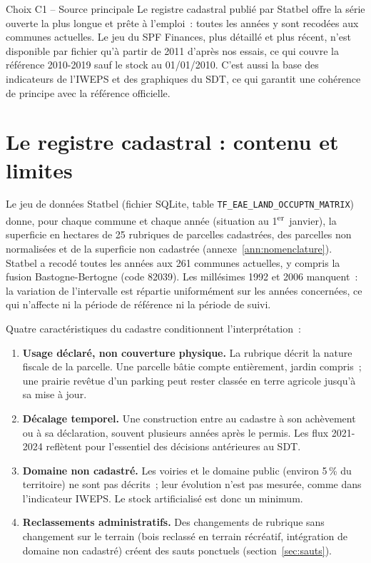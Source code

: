 \documentclass[11pt,a4paper]{report}
\newcommand{\fichier}[1]{\texttt{\small #1}}
\begin{document}
\begin{choix}{Choix C1 -- Source principale}
Le registre cadastral publié par Statbel offre la série ouverte la plus longue et prête à l'emploi~: toutes les années y sont recodées aux communes actuelles. Le jeu du SPF Finances, plus détaillé et plus récent, n'est disponible par fichier qu'à partir de 2011 d'après nos essais, ce qui couvre la référence 2010-2019 sauf le stock au 01/01/2010. C'est aussi la base des indicateurs de l'IWEPS et des graphiques du SDT, ce qui garantit une cohérence de principe avec la référence officielle.
\end{choix}

\section{Le registre cadastral : contenu et limites}
Le jeu de données Statbel (fichier SQLite, table \fichier{TF\_EAE\_LAND\_OCCUPTN\_MATRIX}) donne, pour chaque commune et chaque année (situation au 1\textsuperscript{er}~janvier), la superficie en hectares de 25 rubriques de parcelles cadastrées, des parcelles non normalisées et de la superficie non cadastrée (annexe~\ref{ann:nomenclature}). Statbel a recodé toutes les années aux 261 communes actuelles, y compris la fusion Bastogne-Bertogne (code 82039). Les millésimes 1992 et 2006 manquent~: la variation de l'intervalle est répartie uniformément sur les années concernées, ce qui n'affecte ni la période de référence ni la période de suivi.

Quatre caractéristiques du cadastre conditionnent l'interprétation~:
\begin{enumerate}[label=\alph*)]
\item \textbf{Usage déclaré, non couverture physique.} La rubrique décrit la nature fiscale de la parcelle. Une parcelle bâtie compte entièrement, jardin compris~; une prairie revêtue d'un parking peut rester classée en terre agricole jusqu'à sa mise à jour.
\item \textbf{Décalage temporel.} Une construction entre au cadastre à son achèvement ou à sa déclaration, souvent plusieurs années après le permis. Les flux 2021-2024 reflètent pour l'essentiel des décisions antérieures au SDT.
\item \textbf{Domaine non cadastré.} Les voiries et le domaine public (environ 5\,\% du territoire) ne sont pas décrits~; leur évolution n'est pas mesurée, comme dans l'indicateur IWEPS. Le stock artificialisé est donc un minimum.
\item \textbf{Reclassements administratifs.} Des changements de rubrique sans changement sur le terrain (bois reclassé en terrain récréatif, intégration de domaine non cadastré) créent des sauts ponctuels (section~\ref{sec:sauts}).
\end{enumerate}
\end{document}
